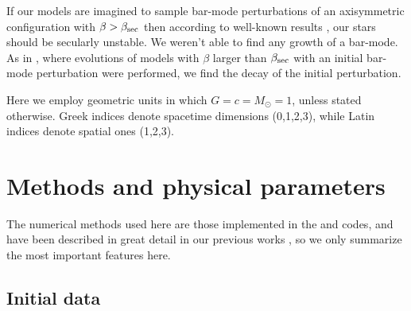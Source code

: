 \documentclass[twocolumn,superscriptaddress,showpacs,prd,aps,amsmath,amssymb,nofootinbib]{revtex4-1}
\newcommand{\GB}{\beta}
\begin{document}
If our models are imagined to sample bar-mode perturbations of an
axisymmetric configuration with $\GB>\GB_{\rm sec}$ then according to
well-known results \cite{SF98}, our stars should be secularly
unstable. We weren't able to find any growth of a bar-mode.  As in
\cite{DLSS04}, where evolutions of models with $\beta$ larger than
$\GB_{\rm sec}$ with an initial bar-mode perturbation were performed,
we find the decay of the initial perturbation.

Here we employ geometric units in which $G=c=M_\odot=1$, unless stated
otherwise. Greek indices denote spacetime dimensions (0,1,2,3), while
Latin indices denote spatial ones (1,2,3).



\section{Methods and physical parameters}
\label{sec:methods}

The numerical methods used here are those implemented in the \cocal{}
and \illinois{} codes, and have been described in great detail in our
previous works \cite{TU07, UT12, UTG12, TU13, TU15,
  TMGRU16, EFLSTB08, ELS10, EPLS12, PLES10, PLES11},
so we only summarize the most important features here.


\subsection{Initial data}
\label{sec:ID}
\end{document}
